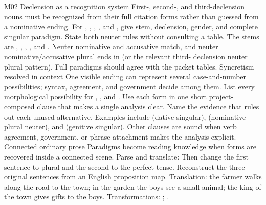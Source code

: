 \begin{courseunit}{M02}
\SubmoduleExtension
  {Declension as a recognition system}
  {First-, second-, and third-declension nouns must be recognized from their
  full citation forms rather than guessed from a nominative ending.}
  {For , , ,
  , and , give stem,
  declension, gender, and complete singular paradigm.}
  {State both neuter rules without consulting a table.}
  {The stems are , , , , and
  .  Neuter nominative and accusative match, and neuter
  nominative/accusative plural ends in  (or the relevant third-
  declension neuter plural pattern).  Full paradigms should agree with the
  packet tables.}
\SubmoduleExtension
  {Syncretism resolved in context}
  {One visible ending can represent several case-and-number possibilities;
  syntax, agreement, and government decide among them.}
  {List every morphological possibility for , ,
  and .  Use each form in one short project-composed clause that
  makes a single analysis clear.}
  {Name the evidence that rules out each unused alternative.}
  {Examples include  (dative singular),
   (nominative plural neuter), and
   (genitive singular).  Other clauses are sound
  when verb agreement, government, or phrase attachment makes the analysis
  explicit.}
\SubmoduleExtension
  {Connected ordinary prose}
  {Paradigms become reading knowledge when forms are recovered inside a
  connected scene.}
  {Parse and translate:   Then change the
  first sentence to plural and the second to the perfect tense.}
  {Reconstruct the three original sentences from an English proposition map.}
  {Translation: the farmer walks along the road to the town; in the garden the
  boys see a small animal; the king of the town gives gifts to the boys.
  Transformations: ;
  .}
\end{courseunit}

